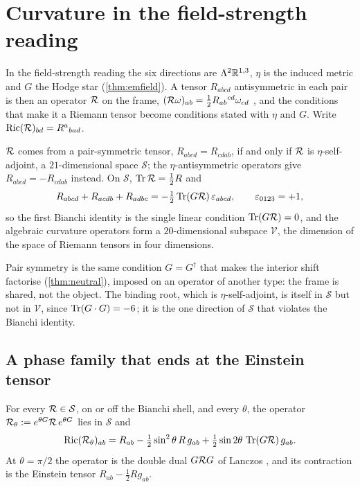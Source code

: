 \section{Curvature in the field-strength reading}
\label{sec:curvop}

In the field-strength reading the six directions are $\Lambda^2\mathbb{R}^{1,3}$, $\eta$ is the induced metric and $G$ the Hodge star (\cref{thm:emfield}). A
tensor $R_{abcd}$ antisymmetric in each pair is then an operator $\mathcal R$ on the frame, $(\mathcal R\omega)_{ab}=\tfrac12R_{ab}{}^{cd}\omega_{cd}$ \cite{SingerThorpe69,Besse87},
and the conditions that make it a Riemann tensor become conditions stated with $\eta$ and $G$. Write $\operatorname{Ric}(\mathcal R)_{bd}=R^a{}_{bad}$.

\begin{proposition}
\label{prop:curvop}
$\mathcal R$ comes from a pair-symmetric tensor, $R_{abcd}=R_{cdab}$, if and only if $\mathcal R$ is $\eta$-self-adjoint, a $21$-dimensional space $\mathcal S$; the
$\eta$-antisymmetric operators give $R_{abcd}=-R_{cdab}$ instead. On $\mathcal S$, $\operatorname{Tr}\mathcal R=\tfrac12R$ and
\[
R_{abcd}+R_{acdb}+R_{adbc}=-\tfrac12\operatorname{Tr}(G\mathcal R)\,\varepsilon_{abcd},\qquad \varepsilon_{0123}=+1,
\]
so the first Bianchi identity is the single linear condition $\operatorname{Tr}(G\mathcal R)=0$, and the algebraic curvature operators form a $20$-dimensional subspace $\mathcal V$,
the dimension of the space of Riemann tensors in four dimensions.
\end{proposition}

Pair symmetry is the same condition $G=G^\dagger$ that makes the interior shift factorise (\cref{thm:neutral}), imposed on an operator of another type: the frame
is shared, not the object. The binding root, which is $\eta$-self-adjoint, is itself in $\mathcal S$ but not in $\mathcal V$, since $\operatorname{Tr}(G\cdot G)=-6$; it is the one
direction of $\mathcal S$ that violates the Bianchi identity.

\subsection{A phase family that ends at the Einstein tensor}

\begin{theorem}
\label{thm:phase}
For every $\mathcal R\in\mathcal S$, on or off the Bianchi shell, and every $\theta$, the operator $\mathcal R_\theta:=e^{\theta G}\mathcal R\,e^{\theta G}$ lies in $\mathcal S$ and
\[
\operatorname{Ric}(\mathcal R_\theta)_{ab}=R_{ab}-\tfrac12\sin^2\theta\,R\,g_{ab}+\tfrac12\sin2\theta\,\operatorname{Tr}(G\mathcal R)\,g_{ab}.
\]
At $\theta=\pi/2$ the operator is the double dual $G\mathcal R G$ of Lanczos \cite{Lanczos38,MTW}, and its contraction is the Einstein tensor $R_{ab}-\tfrac12Rg_{ab}$.
\end{theorem}

